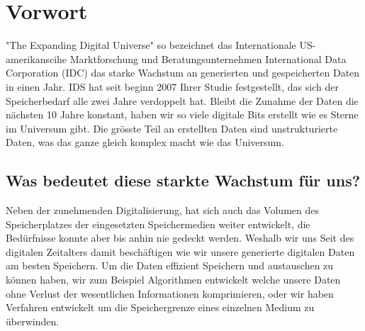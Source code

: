 
\cleardoublepage
\chapter{Vorwort}
"The Expanding Digital Universe" so bezeichnet das Internationale US-amerikanscihe Marktforschung und Beratungsunternehmen International Data Corporation (\ac{IDC}) das starke Wachstum an generierten und gespeicherten Daten in einen Jahr. IDS hat seit beginn 2007 Ihrer Studie festgestellt, das sich der Speicherbedarf alle zwei Jahre verdoppelt hat. Bleibt die Zunahme der Daten die nächsten 10 Jahre konstant, haben wir so viele digitale Bits erstellt wie es Sterne im Universum gibt. Die grösste Teil an erstellten Daten sind unstrukturierte Daten, was das ganze gleich komplex macht wie das Universum.\cite{IDC}

\section{Was bedeutet diese starkte Wachstum für uns?}
Neben der zunehmenden Digitalisierung, hat sich auch das Volumen des Speicherplatzes der eingesetzten Speichermedien weiter entwickelt, die Bedürfnisse konnte aber bis anhin nie gedeckt werden. Weshalb wir uns Seit des digitalen Zeitalters damit beschäftigen wie wir unsere generierte digitalen Daten am besten Speichern. Um die Daten effizient Speichern und austauschen zu können haben, wir zum Beispiel Algorithmen entwickelt welche unsere Daten ohne Verlust der wesentlichen Informationen komprimieren, oder wir haben Verfahren entwickelt um die Speichergrenze eines einzelnen Medium zu überwinden.

